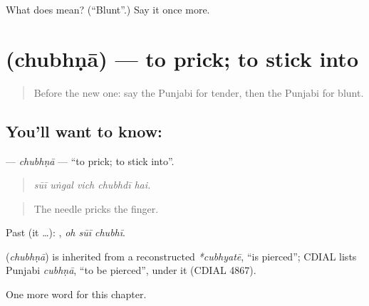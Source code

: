 \begin{tcolorbox}[breakable,colback=teal!4,colframe=teal!35!black,title={Before you move on}]
What does  mean? (\textquotedblleft{}Blunt\textquotedblright{}.) Say it once more.
\end{tcolorbox}
\section[\texorpdfstring{\pa{ਚੁਭਣਾ} (chubhṇā)}{ਚੁਭਣਾ (chubhṇā)}]{ (chubhṇā) — to prick; to stick into}

\label{lesson:PA-C297-chubhna}



\begin{quote}
Before the new one: say the Punjabi for tender, then the Punjabi for blunt.
\end{quote}

\subsection*{You'll want to know: }
\textbf{} — \emph{chubhṇā} — \textquotedblleft{}to prick; to stick into\textquotedblright{}.

\begin{quote}
    
\end{quote}

\begin{quote}
\emph{sūī uṅgal vich chubhdī hai.}
\end{quote}

\begin{quote}
The needle pricks the finger.
\end{quote}

Past (it …):   , \emph{oh sūī chubhī}.

\begin{cousinweb}
\textbf{} (\emph{chubhṇā}) is inherited from a reconstructed \emph{*cubhyatē}, \textquotedblleft{}is pierced\textquotedblright{}; CDIAL lists Punjabi \emph{cubhṇā}, \textquotedblleft{}to be pierced\textquotedblright{}, under it (CDIAL 4867).
\end{cousinweb}

\begin{grammarlens}[title={What you've built}]
One more word for this chapter.
\end{grammarlens}

